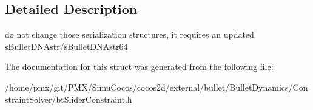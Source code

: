 \subsection{Detailed Description}
do not change those serialization structures, it requires an updated s\+Bullet\+D\+N\+Astr/s\+Bullet\+D\+N\+Astr64 

The documentation for this struct was generated from the following file\+:\begin{DoxyCompactItemize}
\item 
/home/pmx/git/\+P\+M\+X/\+Simu\+Cocos/cocos2d/external/bullet/\+Bullet\+Dynamics/\+Constraint\+Solver/bt\+Slider\+Constraint.\+h\end{DoxyCompactItemize}
